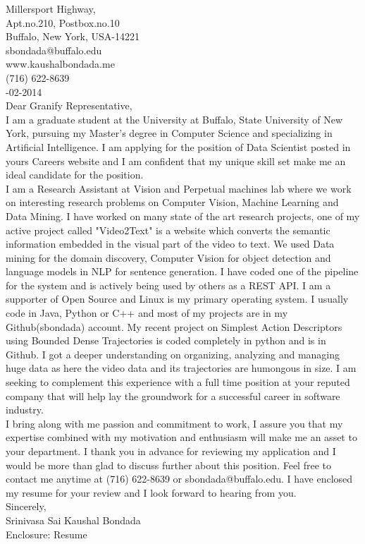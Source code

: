 \documentclass[10pt,letterpaper,oneside]{article}
\begin{document}
 Millersport Highway,\\
Apt.no.210, Postbox.no.10\\
Buffalo, New York, USA-14221\\
sbondada@buffalo.edu\\
www.kaushalbondada.me\\
(716) 622-8639\\

-02-2014\\
 
\noindent Dear Granify Representative,\\
 
I am a graduate student at the University at Buffalo, State University of New York, pursuing my Master's degree in Computer Science and
specializing in Artificial Intelligence. I am applying for the position of Data Scientist posted in yours Careers website and I am confident that my unique skill set make me an ideal candidate for the position.\\

I am a Research Assistant at Vision and Perpetual machines lab where we work on interesting research problems on Computer
Vision, Machine Learning and Data Mining. I have worked on many state of the art research projects, one of my active project called
"Video2Text" is a website which converts the semantic information embedded in the visual part of the video to text. We used Data mining for the
domain discovery, Computer Vision for object detection and language models in NLP for sentence generation. I have coded one of the pipeline
for the system and is actively being used by others as a REST API. I am a supporter of Open Source and Linux is my primary operating
system. I usually code in Java, Python or C++ and most of my projects are in my Github(sbondada) account. My recent project on Simplest Action
Descriptors using Bounded Dense Trajectories is coded completely in python and is in Github. I got a deeper understanding on organizing,
analyzing and managing huge data as here the video data and its trajectories are humongous in size. I am seeking to complement this experience with a full time position at your reputed company that will help lay the groundwork for a successful career in software industry.\\

I bring along with me passion and commitment to work, I assure you that my expertise combined with my motivation and enthusiasm will make me an asset to your department. I thank you in advance for reviewing my application and I would be more than glad to discuss further about this position. Feel free to contact me anytime at (716) 622-8639 or sbondada@buffalo.edu. I have enclosed my resume for your review and I look forward to hearing from you.\\
 
\noindent Sincerely,\\
Srinivasa Sai Kaushal Bondada\\
Enclosure: Resume\\
\end{document}
